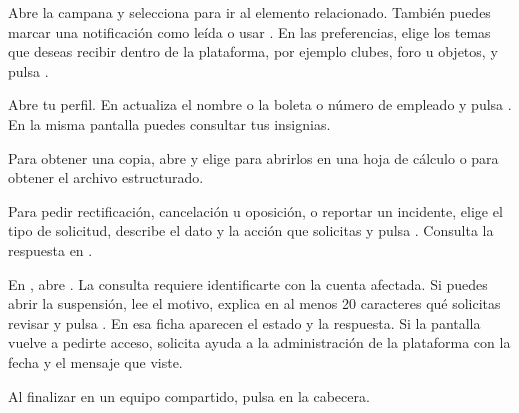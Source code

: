 Abre la campana y selecciona  para ir al elemento relacionado. También puedes marcar una notificación como leída o usar . En las preferencias, elige los temas que deseas recibir dentro de la plataforma, por ejemplo clubes, foro u objetos, y pulsa .
\begin{pasos}
\item Abre tu perfil. En  actualiza el nombre o la boleta o número de empleado y pulsa . En la misma pantalla puedes consultar tus insignias.
\item Para obtener una copia, abre  y elige  para abrirlos en una hoja de cálculo o  para obtener el archivo estructurado.
\item Para pedir rectificación, cancelación u oposición, o reportar un incidente, elige el tipo de solicitud, describe el dato y la acción que solicitas y pulsa . Consulta la respuesta en .
\end{pasos}
En , abre . La consulta requiere identificarte con la cuenta afectada. Si puedes abrir la suspensión, lee el motivo, explica en al menos 20 caracteres qué solicitas revisar y pulsa . En esa ficha aparecen el estado y la respuesta. Si la pantalla vuelve a pedirte acceso, solicita ayuda a la administración de la plataforma con la fecha y el mensaje que viste.
\par Al finalizar en un equipo compartido, pulsa  en la cabecera.


